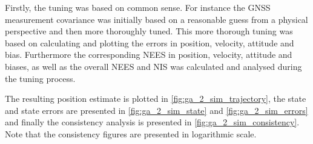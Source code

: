 Firstly, the tuning was based on common sense. For instance the GNSS measurement covariance was initially based on a reasonable guess from a physical perspective and then more thoroughly tuned. This more thorough tuning was based on calculating and plotting the errors in position, velocity, attitude and bias. Furthermore the corresponding NEES in position, velocity, attitude and biases, as well as the overall NEES and NIS was calculated and analysed during the tuning process. 

The resulting position estimate is plotted in \cref{fig:ga_2_sim_trajectory}, the state and state errors are presented in \cref{fig:ga_2_sim_state} and \cref{fig:ga_2_sim_errors} and finally the consistency analysis is presented in \cref{fig:ga_2_sim_consistency}. Note that the consistency figures are presented in logarithmic scale.

